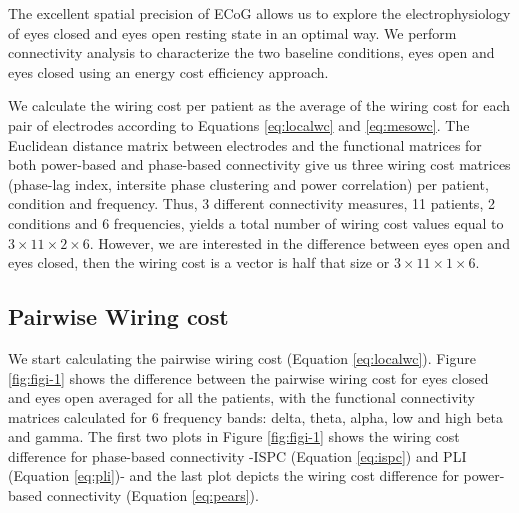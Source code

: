 \documentclass[11pt, onecolumn]{article}
\begin{document}
The excellent spatial precision of ECoG allows us to explore the electrophysiology of eyes closed and eyes open resting state in an optimal way. 
We perform connectivity analysis to characterize the two baseline conditions, eyes open and eyes closed using an energy cost efficiency approach. 

We calculate the wiring cost per patient as the average of the wiring cost for each pair of electrodes according to Equations \ref{eq:localwc} and \ref{eq:mesowc}. The Euclidean distance matrix between electrodes and the functional matrices for both power-based and phase-based connectivity give us three wiring cost matrices (phase-lag index, intersite phase clustering and power correlation) per patient, condition and frequency. Thus, 3 different connectivity measures, 11 patients, 2 conditions and 6 frequencies, yields a total number of wiring cost values equal to $3\times 11 \times 2 \times 6$. However, we are interested in the difference between eyes open and eyes closed, then the wiring cost is a vector is half that size or $3\times 11 \times 1 \times 6$.

\subsection{Pairwise Wiring cost}
We start calculating the pairwise wiring cost (Equation \ref{eq:localwc}). Figure \ref{fig:figi-1} shows the difference between the pairwise wiring cost for eyes closed and eyes open averaged for all the patients, with the functional connectivity matrices calculated for 6 frequency bands: delta, theta, alpha, low and high beta and gamma. 
The first two plots in Figure \ref{fig:figi-1} shows the wiring cost difference for phase-based connectivity -ISPC (Equation \ref{eq:ispc}) and PLI (Equation \ref{eq:pli})- and the last plot depicts the wiring cost difference for power-based connectivity (Equation \ref{eq:pears}).
 
\end{document}
